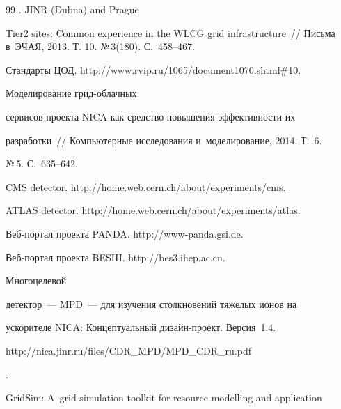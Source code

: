 {{\begin{thebibliography}{99}
. JINR (Dubna) and Prague


Tier2 sites: Common experience in the WLCG grid infrastructure~/\!\!/ Письма в~ЭЧАЯ, 2013. Т. 10. №\,3(180). С.~458--467.




Стандарты ЦОД. {\sf http://www.rvip.ru/1065/document1070.shtml\#10}.




 Моделирование грид-об\-лач\-ных


сервисов проекта NICA как средство повышения эффективности их


разработки~/\!\!/ Компьютерные исследования и~моделирование, 2014. Т.~6.


№\,5. С.~635--642.




CMS detector. {\sf http://home.web.cern.ch/about/experiments/cms}.




ATLAS detector. {\sf http://home.web.cern.ch/about/experiments/atlas}.




Веб-портал проекта PANDA. {\sf http://www-panda.gsi.de}.




 Веб-портал проекта BESIII. {\sf http://bes3.ihep.ac.cn}.




 Многоцелевой


детектор~--- MPD~--- для изучения столкновений тяжелых ионов на


ускорителе NICA: Концептуальный ди\-зайн-про\-ект. Версия~1.4. {\sf


http://nica.jinr.ru/files/CDR\_MPD/MPD\_CDR\_ru.pdf}.




GridSim: A~grid simulation toolkit for resource modelling and application



\end{thebibliography}}}
